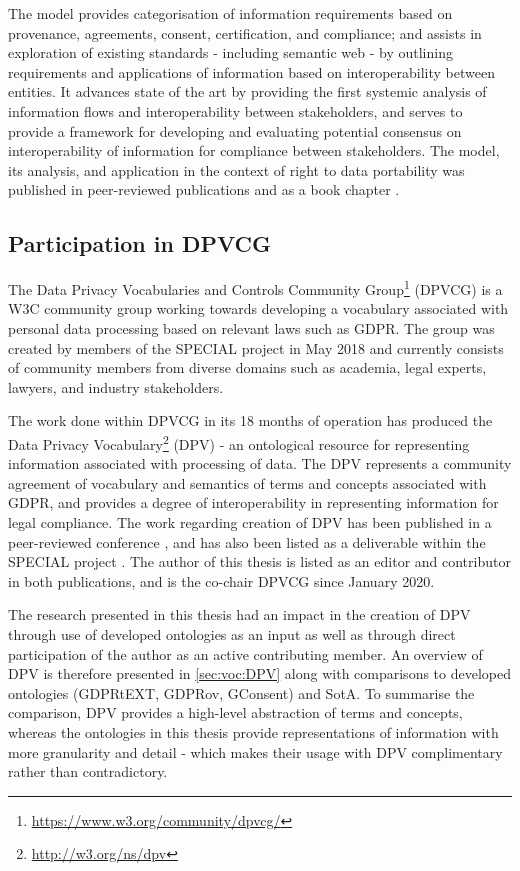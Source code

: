 The model provides categorisation of information requirements based on provenance, agreements, consent, certification, and compliance; and assists in exploration of existing standards - including semantic web - by outlining requirements and applications of information based on interoperability between entities.
It advances state of the art by providing the first systemic analysis of information flows and interoperability between stakeholders, and serves to provide a framework for developing and evaluating potential consensus on interoperability of information for compliance between stakeholders.
The model, its analysis, and application in the context of right to data portability was published in peer-reviewed publications \cite{pandit_modelling_2017,pandit_exploration_2018} and as a book chapter \cite{pandit_standardisation_2020}.

\subsection{Participation in DPVCG}\label{sec:intro:dpvcg}
The Data Privacy Vocabularies and Controls Community Group\footnote{\url{https://www.w3.org/community/dpvcg/}} (DPVCG) is a W3C community group working towards developing a vocabulary associated with personal data processing based on relevant laws such as GDPR.
The group was created by members of the SPECIAL project in May 2018 and currently consists of community members from diverse domains such as academia, legal experts, lawyers, and industry stakeholders.

The work done within DPVCG in its 18 months of operation has produced the Data Privacy Vocabulary\footnote{\url{http://w3.org/ns/dpv}} (DPV) - an ontological resource for representing information associated with processing of data.
The DPV represents a community agreement of vocabulary and semantics of terms and concepts associated with GDPR, and provides a degree of interoperability in representing information for legal compliance.
The work regarding creation of DPV has been published in a peer-reviewed conference \cite{pandit_dpv_2019}, and has also been listed as a deliverable within the SPECIAL project \cite{pandit_d6.5_2019}.
The author of this thesis is listed as an editor and contributor in both publications, and is the co-chair DPVCG since January 2020.

The research presented in this thesis had an impact in the creation of DPV through use of developed ontologies as an input as well as through direct participation of the author as an active contributing member.
An overview of DPV is therefore presented in \autoref{sec:voc:DPV} along with comparisons to developed ontologies (GDPRtEXT, GDPRov, GConsent) and SotA.
To summarise the comparison, DPV provides a high-level abstraction of terms and concepts, whereas the ontologies in this thesis provide representations of information with more granularity and detail - which makes their usage with DPV complimentary rather than contradictory.

